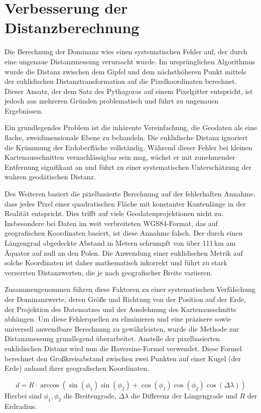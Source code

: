 \section{Verbesserung der Distanzberechnung}
Die Berechnung der Dominanz wies einen systematischen Fehler auf, der durch eine ungenaue Distanzmessung verursacht wurde. Im ursprünglichen Algorithmus wurde die Distanz zwischen dem Gipfel und dem nächsthöheren Punkt mittels der euklidischen Distanztransformation auf die Pixelkoordinaten berechnet. Dieser Ansatz, der dem Satz des Pythagoras auf einem Pixelgitter entspricht, ist jedoch aus mehreren Gründen problematisch und führt zu ungenauen Ergebnissen.

Ein grundlegendes Problem ist die inhärente Vereinfachung, die Geodaten als eine flache, zweidimensionale Ebene zu behandeln. Die euklidische Distanz ignoriert die Krümmung der Erdoberfläche vollständig. Während dieser Fehler bei kleinen Kartenausschnitten vernachlässigbar sein mag, wächst er mit zunehmender Entfernung signifikant an und führt zu einer systematischen Unterschätzung der wahren geodätischen Distanz.

Des Weiteren basiert die pixelbasierte Berechnung auf der fehlerhaften Annahme, dass jedes Pixel einer quadratischen Fläche mit konstanter Kantenlänge in der Realität entspricht. Dies trifft auf viele Geodatenprojektionen nicht zu. Insbesondere bei Daten im weit verbreiteten WGS84-Format, das auf geografischen Koordinaten basiert, ist diese Annahme falsch. Der durch einen Längengrad abgedeckte Abstand in Metern schrumpft von über 111\,km am Äquator auf null an den Polen. Die Anwendung einer euklidischen Metrik auf solche Koordinaten ist daher mathematisch inkorrekt und führt zu stark verzerrten Distanzwerten, die je nach geografischer Breite variieren.

Zusammengenommen führen diese Faktoren zu einer systematischen Verfälschung der Dominanzwerte, deren Größe und Richtung von der Position auf der Erde, der Projektion des Datensatzes und der Ausdehnung des Kartenausschnitts abhängen. Um diese Fehlerquellen zu eliminieren und eine präzisere sowie universell anwendbare Berechnung zu gewährleisten, wurde die Methode zur Distanzmessung grundlegend überarbeitet. Anstelle der pixelbasierten euklidischen Distanz wird nun die Haversine-Formel verwendet. Diese Formel berechnet den Großkreisabstand zwischen zwei Punkten auf einer Kugel (der Erde) anhand ihrer geografischen Koordinaten.

\begin{equation}
    d = R \cdot \arccos(\sin(\phi_1)\sin(\phi_2) + \cos(\phi_1)\cos(\phi_2)\cos(\Delta\lambda))
    \label{eq:haversine}
\end{equation}
Hierbei sind $\phi_1, \phi_2$ die Breitengrade, $\Delta\lambda$ die Differenz der Längengrade und $R$ der Erdradius.

